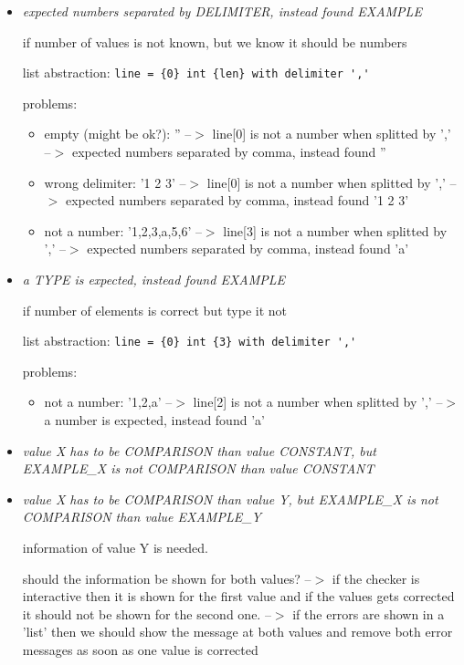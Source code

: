 \documentclass[11pt]{article}
\begin{document}
\begin{itemize}
\item \textit{expected numbers separated by DELIMITER, instead found EXAMPLE}

if number of values is not known, but we know it should be numbers

list abstraction: \verb|line = {0} int {len} with delimiter ','|

problems:
\begin{itemize}
\item empty (might be ok?): '' --$>$ line[0] is not a number when splitted by ',' --$>$ expected numbers separated by comma, instead found ''
\item wrong delimiter: '1 2 3' --$>$ line[0] is not a number when splitted by ',' --$>$ expected numbers separated by comma, instead found '1 2 3'
\item not a number: '1,2,3,a,5,6' --$>$ line[3] is not a number when splitted by ',' --$>$ expected numbers separated by comma, instead found 'a'
\end{itemize}

\item \textit{a TYPE is expected, instead found EXAMPLE}

if number of elements is correct but type it not

list abstraction: \verb|line = {0} int {3} with delimiter ','|

problems:
\begin{itemize}
\item not a number: '1,2,a' --$>$ line[2] is not a number when splitted by ',' --$>$ a number is expected, instead found 'a'
\end{itemize}

\item \textit{value X has to be COMPARISON than value CONSTANT, but EXAMPLE\_X is not COMPARISON than value CONSTANT}

\item \textit{value X has to be COMPARISON than value Y, but EXAMPLE\_X is not COMPARISON than value EXAMPLE\_Y}

information of value Y is needed. 

should the information be shown for both values? --$>$ if the checker is interactive then it is shown for the first value and if the values gets corrected it should not be shown for the second one. --$>$ if the errors are shown in a 'list' then we should show the message at both values and remove both error messages as soon as one value is corrected


\end{itemize}
\end{document}
